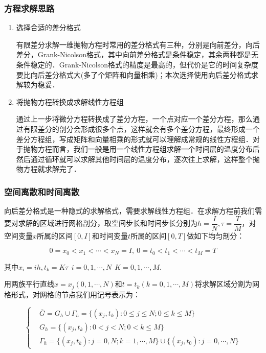 \documentclass[UTF8]{beamer}
\begin{document}
\begin{frame}[t]\frametitle{方程求解思路}

\begin{enumerate}
\item 选择合适的差分格式

有限差分求解一维抛物方程时常用的差分格式有三种，分别是向前差分，向后差分，Grank-Nicolson格式，其中向前差分格式是条件稳定，其余两种都是无条件稳定的．Grank-Nicolson格式的精度是最高的，但代价是它的时间复杂度要比向后差分格式大(多了个矩阵和向量相乘)；本次选择使用向后差分格式求解较为稳妥．

\item 将抛物方程转换成求解线性方程组

通过上一步将微分方程转换成了差分方程，一个点对应一个差分方程，那么通过有限差分的剖分会形成很多个点，这样就会有多个差分方程，最终形成一个差分方程组，写成矩阵和向量相乘的形式就可以理解成常规的线性方程组．对于抛物方程而言，我们一般是用一个线性方程组求解一个时间层的温度分布后然后通过循环就可以求解其他时间层的温度分布，逐次往上求解，这样整个抛物方程就求解完了．

\end{enumerate}

\end{frame}

\begin{frame}[t]\frametitle{空间离散和时间离散}

向后差分格式是一种隐式的求解格式，需要求解线性方程组．在求解方程前我们需要对求解的区域进行网格剖分，取空间步长和时间步长分别为$h=\dfrac{I}{N},\tau= \dfrac{T}{M}$，对空间变量$x$所属的区间$[0,I]$和时间变量$t$所属的区间$[0,T]$做如下均匀剖分：

\begin{equation}
0=x_0<x_1<\cdots<x_N=I,~0=t_0<t_1<\cdots<t_M=T
\end{equation}

其中$x_i = ih,t_k=K\tau~~i=0,1,\cdots,N~~K=0,1,\cdots,M$.

用两族平行直线$x=x_j(0,1,\cdots,N)$和$t=t_k(k=0,1,\cdots,M)$将求解区域分割为网格形式，对网格的节点我们用记号表示为：

\begin{equation*}
\left \{
\begin{aligned}
& \overline{G}=G_h \cup \Gamma_h=\{ (x_j,t_k):0\leq j\leq N;0\leq k \leq M \}　\\
& G_h = \{ (x_j,t_k):0<j<N;0<k\leq M \} \\
& \Gamma_h=\{ (x_j,t_k):j=0,N;k=1,\cdots,M \} \cup \{  (x_j,t_0):j=0,\cdots,N \}
\end{aligned}
\right.
\end{equation*}

\end{frame}
\end{document}
